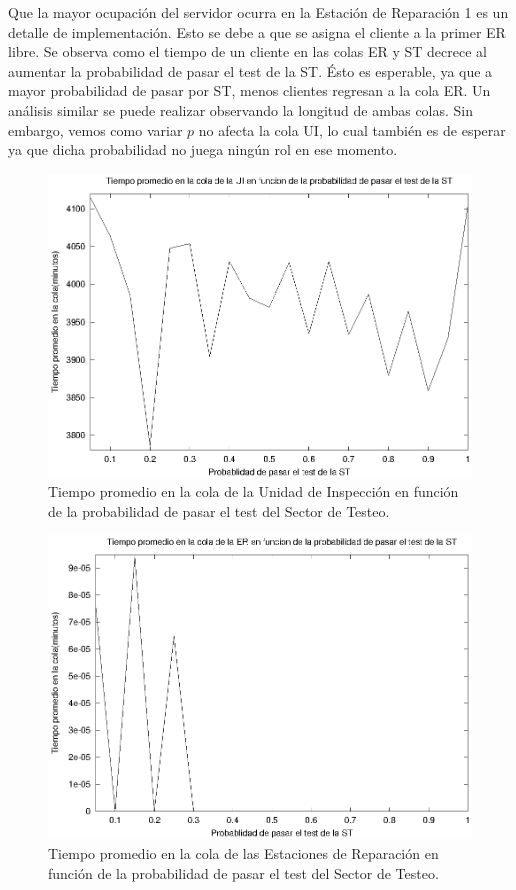 \documentclass[a4paper,10pt]{article}
\begin{document}
Que la mayor ocupaci\'on del servidor ocurra en la Estaci\'on de Reparaci\'on 1 es un detalle de implementaci\'on. Esto se debe a
que se asigna el cliente a la primer ER libre. Se observa como el tiempo de un cliente en las colas
ER y ST decrece al aumentar la probabilidad de pasar el test de la ST. \'Esto es esperable, ya que a mayor probabilidad de pasar por
ST, menos clientes regresan a la cola ER. Un an\'alisis similar se puede realizar observando la longitud de ambas colas. Sin embargo,
vemos como variar $p$ no afecta la cola UI, lo cual tambi\'en es de esperar ya que dicha probabilidad no juega ning\'un rol en ese
momento.

\begin{figure}[ht]
\begin{center}
\includegraphics[width=15cm]{./img/tp_UI.eps}
\caption{\label{fig:tp_UI} Tiempo promedio en la cola de la Unidad de Inspecci\'on en funci\'on de la probabilidad de pasar el test del Sector de Testeo.}
\end{center}
\end{figure}

\begin{figure}[ht]
\begin{center}
\includegraphics[width=15cm]{./img/tp_ER.eps}
\caption{\label{fig:tp_ER} Tiempo promedio en la cola de las Estaciones de Reparaci\'on en funci\'on de la probabilidad de pasar el test del Sector de Testeo.}
\end{center}
\end{figure}
\end{document}
